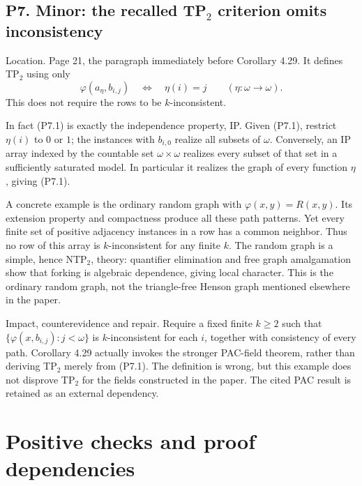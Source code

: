 \documentclass[10pt]{article}
\begin{document}
\subsection*{P7. Minor: the recalled TP\(_2\) criterion omits inconsistency}
Location. Page 21, the paragraph immediately before Corollary 4.29. It defines TP\(_2\) using only \[\varphi(a_\eta,b_{i,j})\quad\Longleftrightarrow\quad
          \eta(i)=j\qquad(\eta:\omega\longrightarrow\omega).
          \tag{P7.1}\] This does not require the rows to be \(k\)-inconsistent.\par
In fact (P7.1) is exactly the independence property, IP. Given (P7.1), restrict \(\eta(i)\) to \(0\) or \(1\); the instances with \(b_{i,0}\) realize all subsets of \(\omega\). Conversely, an IP array indexed by the countable set \(\omega\times\omega\) realizes every subset of that set in a sufficiently saturated model. In particular it realizes the graph of every function \(\eta\), giving (P7.1).\par
A concrete example is the ordinary random graph with \(\varphi(x,y)=R(x,y)\). Its extension property and compactness produce all these path patterns. Yet every finite set of positive adjacency instances in a row has a common neighbor. Thus no row of this array is \(k\)-inconsistent for any finite \(k\). The random graph is a simple, hence NTP\(_2\), theory: quantifier elimination and free graph amalgamation show that forking is algebraic dependence, giving local character. This is the ordinary random graph, not the triangle-free Henson graph mentioned elsewhere in the paper.\par
Impact, counterevidence and repair. Require a fixed finite \(k\ge2\) such that \(\{\varphi(x,b_{i,j}):j<\omega\}\) is \(k\)-inconsistent for each \(i\), together with consistency of every path. Corollary 4.29 actually invokes the stronger PAC-field theorem, rather than deriving TP\(_2\) merely from (P7.1). The definition is wrong, but this example does not disprove TP\(_2\) for the fields constructed in the paper. The cited PAC result is retained as an external dependency.\par
\section*{Positive checks and proof dependencies}
\end{document}
